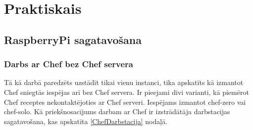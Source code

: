 \chapter{Praktiskais}

\section{RaspberryPi sagatavošana}

\subsection{Darbs ar Chef bez Chef servera}
Tā kā darbā paredzēts uzstādīt tikai vienu instanci, tika apskatīts kā izmantot Chef sniegtās iespējas arī bez Chef servera. Ir pieejami divi varianti, kā piemērot Chef receptes nekontaktējoties ar Chef serveri. Iespējams izmantot chef-zero vai chef-solo.
Kā priekšnosacījums darbam ar Chef ir izstrādātāja darbstacijas sagatavošana, kas apskatīta \ref{ChefDarbstacija} nodaļā.

